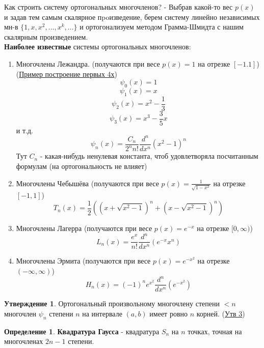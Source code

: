\documentclass[specialist, subf, href, colorlinks=true, 12pt, times, mtpro, final]{disser}
\theoremstyle{definition}
\newtheorem{defn}{Определение}[section]
\newtheorem{state}{Утверждение}[section]
\begin{document}
    Как строить систему ортогональных многочленов? - Выбрав какой-то вес $p(x)$ и задав тем самым скалярное пpoизведение, берем систему линейно независимых мн-в $\{1,x,x^2,...,x^k,...\}$ и ортогонализуем методом Грамма-Шмидта с нашим скалярным произведением.\\
    \textbf{Наиболее известные} системы ортогональных многочленов:
    \begin{enumerate}
        \item Многочлены Лежандра. (получаются при весе $p(x) = 1$ на отрезке $[-1.1]$) (\hyperlink {lects.41}{Пример построение первых 4х})
        $$
            \psi_0(x) = 1
        $$
        $$
            \psi_1(x) = x
        $$
        $$
            \psi_2(x) = x^2 - \frac{1}{3}
        $$
        $$
            \psi_3(x) = x^3 - \frac{3}{5}x
        $$
        и т.д.
        $$
            \psi_n(x) = \frac{C_n}{2^n n!} \frac{d^n}{dx^n} (x^2 - 1)^n
        $$
        Тут $C_n$ - какая-нибудь ненулевая константа, чтоб удовлетворяла посчитанным формулам (на ортогональность не влияет)
        \item Многочлены Чебышёва (получаются при весе $p(x) = \frac{1}{\sqrt{1-x^2}}$ на отрезке $[-1, 1]$)
        $$
            T_n(x) = \frac{1}{2}\left( \left( x + \sqrt{x^2 - 1} \right)^n + \left( x - \sqrt{x^2 - 1} \right)^n \right)
        $$
        \item Многочлены Лагерра (получаются при весе $p(x) = e^{-x}$ на отрезке $[0, \infty)$)
        $$
            L_n(x) = \frac{e^x}{n!}\frac{d^n}{dx^n}(e^{-x}x^n)
        $$
        \item Многочлены Эрмита (получаются при весе $p(x) = e^{-x^2}$ на отрезке $(-\infty, \infty)$)
        $$
            H_n(x) = (-1)^n e^{x^2} \frac{d^n}{dx^n}(e^{-x^2})
        $$
    \end{enumerate}

    \begin{state}
        Ортогональный произвольному многочлену степени $<n$ многочлен $\psi_n$ степени $n$ на интервале $(a,b)$ имеет ровно $n$ корней. (\hyperlink {lects.41}{Утв 3})
    \end{state}

    \begin{defn}
        \textbf{Квадратура Гаусса} - квадратура $S_n$ на $n$ точках, точная на многочленах $2n-1$ степени.
    \end{defn}
    
\end{document}
